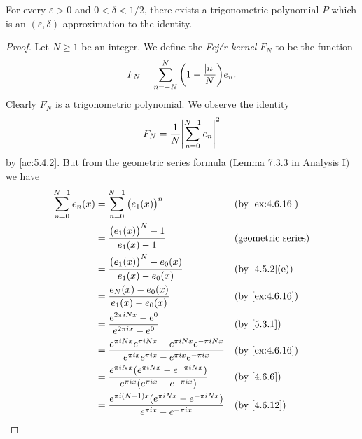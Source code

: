 \begin{lem}\label{5.4.6}
  For every \(\varepsilon > 0\) and \(0 < \delta < 1 / 2\), there exists a trigonometric polynomial \(P\) which is an \((\varepsilon, \delta)\) approximation to the identity.
\end{lem}

\begin{proof}
  Let \(N \geq 1\) be an integer.
  We define the \emph{Fejér kernel} \(F_N\) to be the function
  \[
    F_N = \sum_{n = -N}^N \bigg(1 - \dfrac{\left\lvert n\right\rvert}{N}\bigg) e_n.
  \]
  Clearly \(F_N\) is a trigonometric polynomial.
  We observe the identity
  \[
    F_N = \dfrac{1}{N} \abs{\sum_{n = 0}^{N - 1} e_n}^2
  \]
  by \cref{ac:5.4.2}.
  But from the geometric series formula (Lemma 7.3.3 in Analysis I) we have
  \begin{align*}
    \sum_{n = 0}^{N - 1} e_n(x) & = \sum_{n = 0}^{N - 1} \big(e_1(x)\big)^n                                                                                &  & \text{(by \cref{ex:4.6.16})} \\
                                & = \dfrac{\big(e_1(x)\big)^N - 1}{e_1(x) - 1}                                                                             &  & \text{(geometric series)}    \\
                                & = \dfrac{\big(e_1(x)\big)^N - e_0(x)}{e_1(x) - e_0(x)}                                                                   &  & \text{(by \cref{4.5.2}(e))}  \\
                                & = \dfrac{e_N(x) - e_0(x)}{e_1(x) - e_0(x)}                                                                               &  & \text{(by \cref{ex:4.6.16})} \\
                                & = \dfrac{e^{2 \pi i N x} - e^0}{e^{2 \pi i x} - e^0}                                                                     &  & \by{5.3.1}                   \\
                                & = \dfrac{e^{\pi i N x} e^{\pi i N x} - e^{\pi i N x} e^{-\pi i N x}}{e^{\pi i x} e^{\pi i x} - e^{\pi i x} e^{-\pi i x}} &  & \text{(by \cref{ex:4.6.16})} \\
                                & = \dfrac{e^{\pi i N x} (e^{\pi i N x} - e^{-\pi i N x})}{e^{\pi i x} (e^{\pi i x} - e^{-\pi i x})}                       &  & \by{4.6.6}                   \\
                                & = \dfrac{e^{\pi i (N - 1) x} (e^{\pi i N x} - e^{-\pi i N x})}{e^{\pi i x} - e^{-\pi i x}}                               &  & \text{(by \cref{4.6.12})}    \\

\end{align*}
\end{proof}
